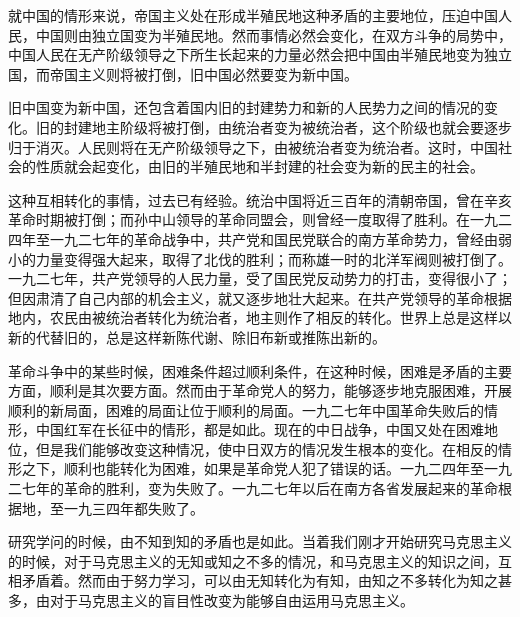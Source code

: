 \documentclass[UTF8, 12pt, a4paper]{ctexrep}
\begin{document}
就中国的情形来说，帝国主义处在形成半殖民地这种矛盾的主要地位，压迫中国人民，中国则由独立国变为半殖民地。然而事情必然会变化，在双方斗争的局势中，中国人民在无产阶级领导之下所生长起来的力量必然会把中国由半殖民地变为独立国，而帝国主义则将被打倒，旧中国必然要变为新中国。

旧中国变为新中国，还包含着国内旧的封建势力和新的人民势力之间的情况的变化。旧的封建地主阶级将被打倒，由统治者变为被统治者，这个阶级也就会要逐步归于消灭。人民则将在无产阶级领导之下，由被统治者变为统治者。这时，中国社会的性质就会起变化，由旧的半殖民地和半封建的社会变为新的民主的社会。

这种互相转化的事情，过去已有经验。统治中国将近三百年的清朝帝国，曾在辛亥革命时期被打倒；而孙中山领导的革命同盟会，则曾经一度取得了胜利。在一九二四年至一九二七年的革命战争中，共产党和国民党联合的南方革命势力，曾经由弱小的力量变得强大起来，取得了北伐的胜利；而称雄一时的北洋军阀则被打倒了。一九二七年，共产党领导的人民力量，受了国民党反动势力的打击，变得很小了；但因肃清了自己内部的机会主义，就又逐步地壮大起来。在共产党领导的革命根据地内，农民由被统治者转化为统治者，地主则作了相反的转化。世界上总是这样以新的代替旧的，总是这样新陈代谢、除旧布新或推陈出新的。

革命斗争中的某些时候，困难条件超过顺利条件，在这种时候，困难是矛盾的主要方面，顺利是其次要方面。然而由于革命党人的努力，能够逐步地克服困难，开展顺利的新局面，困难的局面让位于顺利的局面。一九二七年中国革命失败后的情形，中国红军在长征中的情形，都是如此。现在的中日战争，中国又处在困难地位，但是我们能够改变这种情况，使中日双方的情况发生根本的变化。在相反的情形之下，顺利也能转化为困难，如果是革命党人犯了错误的话。一九二四年至一九二七年的革命的胜利，变为失败了。一九二七年以后在南方各省发展起来的革命根据地，至一九三四年都失败了。

研究学问的时候，由不知到知的矛盾也是如此。当着我们刚才开始研究马克思主义的时候，对于马克思主义的无知或知之不多的情况，和马克思主义的知识之间，互相矛盾着。然而由于努力学习，可以由无知转化为有知，由知之不多转化为知之甚多，由对于马克思主义的盲目性改变为能够自由运用马克思主义。
\end{document}
